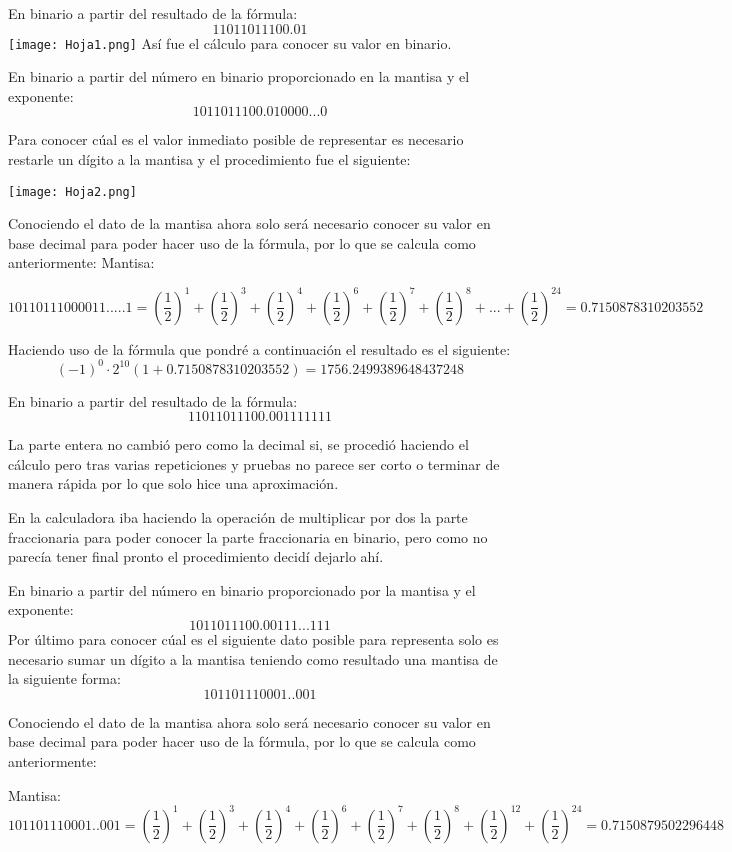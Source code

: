 \documentclass{article}
\begin{document}
En binario a partir del resultado de la fórmula:
$$11011011100. 01$$
\texttt{[image: Hoja1.png]}
Así fue el cálculo para conocer su valor en binario.

En binario a partir del número en binario proporcionado en la mantisa y el
exponente:
$$1011011100. 010000... 0$$

Para conocer cúal es el valor inmediato posible de representar es necesario restarle
un dígito a la mantisa y el procedimiento fue el siguiente:

\texttt{[image: Hoja2.png]}

Conociendo el dato de la mantisa ahora solo será necesario conocer su valor en
base decimal para poder hacer uso de la fórmula, por lo que se calcula como
anteriormente:
Mantisa: 

$$10110111000011..... 1 = (\frac{1}{2})^1 + (\frac{1}{2})^3 + (\frac{1}{2})^4 + (\frac{1}{2})^6 + (\frac{1}{2})^7  + (\frac{1}{2})^8 + ... + (\frac{1}{2})^{24} = 0. 7150878310203552$$

Haciendo uso de la fórmula que pondré a continuación el resultado es el siguiente:
$$(- 1)^0\cdot2^{10}(1 + 0. 7150878310203552) = 1756. 2499389648437248$$

En binario a partir del resultado de la fórmula:
$$11011011100. 001111111$$

La parte entera no cambió pero como la decimal si, se procedió haciendo el cálculo
pero tras varias repeticiones y pruebas no parece ser corto o terminar de manera
rápida por lo que solo hice una aproximación.

En la calculadora iba haciendo la operación de multiplicar por dos la parte
fraccionaria para poder conocer la parte fraccionaria en binario, pero como no
parecía tener final pronto el procedimiento decidí dejarlo ahí.

En binario a partir del número en binario proporcionado por la mantisa y el
exponente:
$$1011011100. 00111... 111$$
Por último para conocer cúal es el siguiente dato posible para representa solo es
necesario sumar un dígito a la mantisa teniendo como resultado una mantisa de la
siguiente forma:
$$101101110001.. 001$$

Conociendo el dato de la mantisa ahora solo será necesario conocer su valor en
base decimal para poder hacer uso de la fórmula, por lo que se calcula como
anteriormente:

Mantisa: 
$$101101110001.. 001 = (\frac{1}{2})^1 + (\frac{1}{2})^3+ (\frac{1}{2})^4+ (\frac{1}{2})^6+ (\frac{1}{2})^7+ (\frac{1}{2})^8+ (\frac{1}{2})^{12}+ (\frac{1}{2})^{24} = 0. 7150879502296448$$
\end{document}
